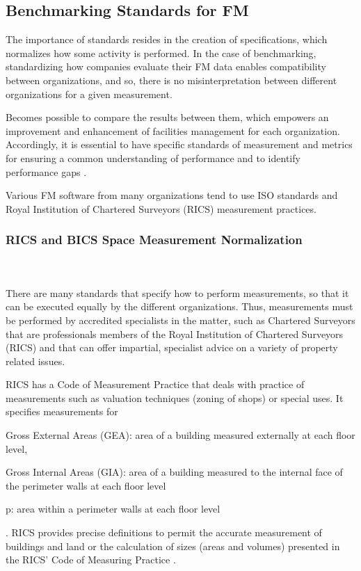 \subsection{Benchmarking Standards for FM}

The importance of standards resides in the creation of specifications, which normalizes how some activity is performed. In the case of benchmarking, standardizing how companies evaluate their FM data enables compatibility between organizations, and so, there is no misinterpretation between different organizations for a given measurement. 

Becomes possible to compare the results between them, which empowers an improvement and enhancement of facilities management for each organization. Accordingly, it is essential to have specific standards of measurement and metrics for ensuring a common understanding of performance and to identify performance gaps \cite{Mass1998}.

Various FM software from many organizations tend to use ISO standards and Royal Institution of Chartered Surveyors (RICS) measurement practices. 

\subsubsection{RICS and BICS Space Measurement Normalization}

\hfill \\ \\ There are many standards that specify how to perform measurements, so that it can be executed equally by the different organizations. Thus, measurements must be performed by accredited specialists in the matter, such as Chartered Surveyors that are professionals members of the Royal Institution of Chartered Surveyors (RICS) and that can offer impartial, specialist advice on a variety of property related issues.

RICS has a Code of Measurement Practice that deals with practice of measurements such as valuation techniques (zoning of shops) or special uses. It specifies measurements for 
\begin{enumerate*}[label=\itshape\roman{enumi})]
	\item Gross External Areas (GEA): area of a building measured externally at each floor level, 
	\item Gross Internal Areas (GIA): area of a building measured to the internal face of the perimeter walls at each floor level 
	\item p: area within a perimeter walls at each floor level
\end{enumerate*} \cite{RICS2007}.
RICS provides precise definitions to permit the accurate measurement of buildings and land or the calculation of sizes (areas and volumes) presented in the RICS' Code of Measuring Practice \cite{RICS2007}. %

